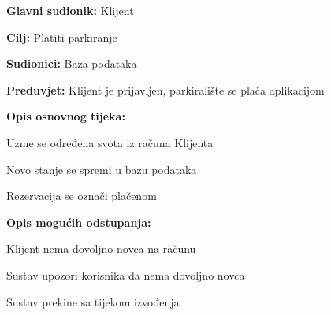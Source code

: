 						\noindent {}
					\begin{packed_item}
	
						\item \textbf{Glavni sudionik: }Klijent
						\item  \textbf{Cilj:} Platiti parkiranje
						\item  \textbf{Sudionici:} Baza podataka
						\item  \textbf{Preduvjet:} Klijent je prijavljen, parkiralište se plača aplikacijom
						\item  \textbf{Opis osnovnog tijeka:}
						
						\item[] \begin{packed_enum}
	
							\item Uzme se određena svota iz računa Klijenta
							\item Novo stanje se spremi u bazu podataka
							\item Rezervacija se označi plačenom 
							
							
						\end{packed_enum}

						\item  \textbf{Opis mogućih odstupanja:}
						
						\item[] \begin{packed_item}
	
							\item[1.a] Klijent nema dovoljno novca na računu
							\item[] \begin{packed_enum}
								
								\item Sustav upozori korisnika da nema dovoljno novca
								\item Sustav prekine sa tijekom izvođenja
								
								
							\end{packed_enum}
	
							
						\end{packed_item}	

					\end{packed_item}


